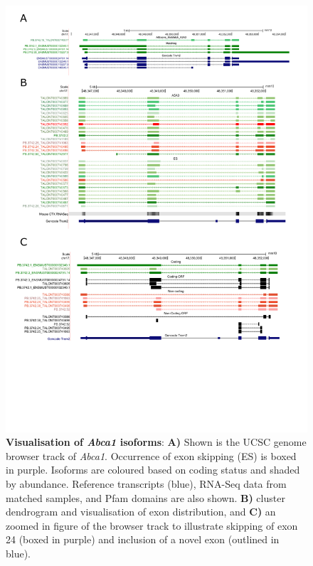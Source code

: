 \begin{landscape}
	\begin{figure}[htp]
		\begin{center}
			\includegraphics[page=5,trim={0 4cm 0 0},scale = 0.85]{Figures/pdfjoiner.pdf}
		\end{center}
		\captionsetup{width=1.5\textwidth}
		\caption[Visualisation of \textit{Abca1} isoforms]%
		{\textbf{Visualisation of \textit{Abca1} isoforms}: \textbf{A)} Shown is the UCSC genome browser track of \textit{Abca1}. Occurrence of exon skipping (ES) is boxed in purple. Isoforms are coloured based on coding status and shaded by abundance. Reference transcripts (blue), RNA-Seq data from matched samples, and Pfam domains are also shown. \textbf{B)} cluster dendrogram and visualisation of exon distribution, and \textbf{C)} an zoomed in figure of the browser track to illustrate skipping of exon 24 (boxed in purple) and inclusion of a novel exon (outlined in blue).}   
		\label{fig:abca1}
	\end{figure}
\end{landscape}

